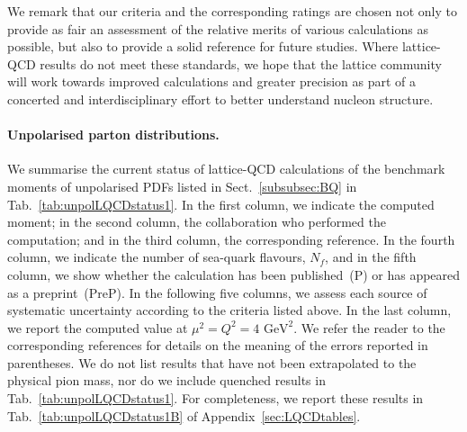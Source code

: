 We remark that our criteria and the corresponding ratings are chosen 
not only to provide as fair an assessment of the relative merits of various 
calculations as possible, but also to provide a solid reference for future studies.
%
Where lattice-QCD results do not meet these standards, we hope that the lattice 
community will work towards improved calculations and greater precision as 
part of a concerted and interdisciplinary effort to better understand
nucleon structure.

\paragraph{Unpolarised parton distributions.}
We summarise the current status of lattice-QCD calculations of the benchmark 
moments of unpolarised PDFs listed in Sect.~\ref{subsubsec:BQ} in 
Tab.~\ref{tab:unpolLQCDstatus1}. 
%
In the first column, we indicate the computed moment; in the second column,
the collaboration who performed the computation; and in the third column,
the corresponding reference.
%
In the fourth column, we indicate the number of sea-quark flavours, $N_f$, 
and in the fifth column, we show whether the calculation has been published~(P) 
or has appeared as a preprint~(PreP).
%
In the following five columns, we assess each source of systematic uncertainty
according to the criteria listed above. 
%
In the last column, we report the computed value at $\mu^2=Q^2=4\mbox{ GeV}^2$.
%
We refer the reader to the corresponding references for details on the 
meaning of the errors reported in parentheses.
%
We do not list results that have not been extrapolated to the physical pion 
mass, nor do we include quenched results in Tab.~\ref{tab:unpolLQCDstatus1}. 
%
For completeness, we report these results in Tab.~\ref{tab:unpolLQCDstatus1B} 
of Appendix~\ref{sec:LQCDtables}.

